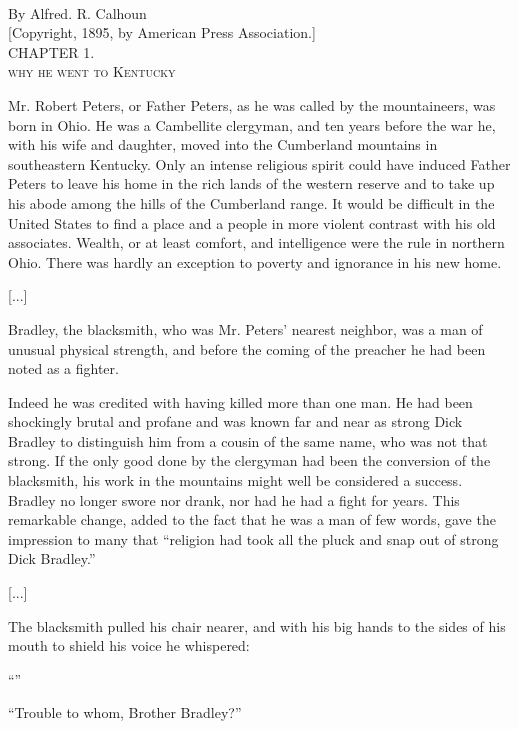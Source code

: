 \begin{ipquote}
\begin{center}
\\
By Alfred. R. Calhoun\\
{[Copyright, 1895, by American Press Association.]}\\
CHAPTER 1.\\
\textsc{why he went to Kentucky}   
\end{center}
{Mr. Robert Peters, or Father Peters, as he was called by the mountaineers, was born in Ohio. He was a Cambellite clergyman, and ten years before the war he, with his wife and daughter, moved into the Cumberland mountains in southeastern Kentucky. Only an intense religious spirit could have induced Father Peters to leave his home in the rich lands of the western reserve and to take up his abode among the hills of the Cumberland range. It would be difficult in the United States to find a place and a people in more violent contrast with his old associates. Wealth, or at least comfort, and intelligence were the rule in northern Ohio. There was hardly an exception to poverty and ignorance in his new home.

\centering
{[...]}

Bradley, the blacksmith, who was Mr. Peters’ nearest neighbor, was a man of unusual physical strength, and before the coming of the preacher he had been noted as a fighter.} {Indeed he was credited with having killed more than one man. He had been shockingly brutal and profane and was known far and near as strong Dick Bradley to distinguish him from a cousin of the same name, who was not that strong. If the only good done by the clergyman had been the conversion of the blacksmith, his work in the mountains might well be considered a success. Bradley no longer swore nor drank, nor had he had a fight for years. This remarkable change, added to the fact that he was a man of few words, gave the impression to many that “religion had took all the pluck and snap out of strong Dick Bradley.”

\centering
{[...]}

The blacksmith pulled his chair nearer, and with his big hands to the sides of his mouth to shield his voice he whispered:}

“”

“Trouble to whom, Brother Bradley?”


\end{ipquote}

